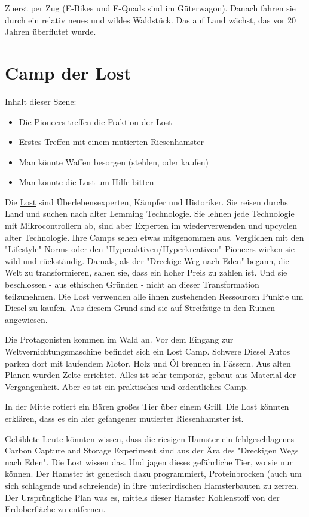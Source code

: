 Zuerst per Zug (E-Bikes und E-Quads sind im Güterwagon). Danach fahren sie durch ein relativ neues und wildes Waldstück. Das auf Land wächst, das vor 20 Jahren überflutet wurde.

\section{Camp der Lost}

Inhalt dieser Szene:

\begin{itemize}
\item Die Pioneers treffen die Fraktion der Lost
\item Erstes Treffen mit einem mutierten Riesenhamster
\item Man könnte Waffen besorgen (stehlen, oder kaufen)
\item Man könnte die Lost um Hilfe bitten
\end{itemize}

\begin{sidebarBox}[title=Die Lost]
Die \hyperref[sec:Lost]{Lost} sind Überlebensexperten, Kämpfer und Historiker. Sie reisen durchs Land und suchen nach alter Lemming Technologie. Sie lehnen jede Technologie mit Mikrocontrollern ab, sind aber Experten im wiederverwenden und upcyclen alter Technologie. Ihre Camps sehen etwas mitgenommen aus. Verglichen mit den "Lifestyle" Norms oder den "Hyperaktiven/Hyperkreativen" Pioneers wirken sie wild und rückständig.
Damals, als der "Dreckige Weg nach Eden" begann, die Welt zu transformieren, sahen sie, dass ein hoher Preis zu zahlen ist. Und sie beschlossen - aus ethischen Gründen - nicht an dieser Transformation teilzunehmen.
Die Lost verwenden alle ihnen zustehenden Ressourcen Punkte um Diesel zu kaufen. Aus diesem Grund sind sie auf Streifzüge in den Ruinen angewiesen.
\end{sidebarBox}

Die Protagonisten kommen im Wald an. Vor dem Eingang zur Weltvernichtungsmaschine befindet sich ein Lost Camp. Schwere Diesel Autos parken dort mit laufendem Motor. Holz und Öl brennen in Fässern. Aus alten Planen wurden Zelte errichtet. Alles ist sehr temporär, gebaut aus Material der Vergangenheit. Aber es ist ein praktisches und ordentliches Camp.

In der Mitte rotiert ein Bären großes Tier über einem Grill. Die Lost könnten erklären, dass es ein hier gefangener mutierter Riesenhamster ist.

\begin{sidebarBox}[title=Fehlgeschlagenes CCS Experiment: Monsterhamster]
Gebildete Leute könnten wissen, dass die riesigen Hamster ein fehlgeschlagenes Carbon Capture and Storage Experiment sind aus der Ära des "Dreckigen Wegs nach Eden". Die Lost wissen das. Und jagen dieses gefährliche Tier, wo sie nur können. Der Hamster ist genetisch dazu programmiert, Proteinbrocken (auch um sich schlagende und schreiende) in ihre unterirdischen Hamsterbauten zu zerren. Der Ursprüngliche Plan was es, mittels dieser Hamster Kohlenstoff von der Erdoberfläche zu entfernen.
\end{sidebarBox}

